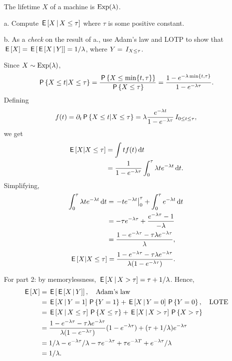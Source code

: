 \begin{exercise}
The lifetime $X$ of a machine is $\Exp{\lambda}$.

a. Compute $\E{X \given X\leq \tau}$ where $\tau$ is some positive constant.

b. As a \emph{check} on the result of a., use  Adam's law and LOTP to show that $\E{X} = \E{\E{X\given Y}} = 1/\lambda$, where $Y=\1{X\leq \tau}$.
\begin{solution}
Since $X\sim \Exp{\lambda}$,
\begin{equation*}
\P{X\leq t | X\leq \tau} = \frac{\P{X\leq \min\{t, \tau\}}}{\P{X\leq \tau}} = \frac{1-e^{-\lambda\min\{t, \tau\}}}{1-e^{-\lambda \tau}}.
\end{equation*}
 Defining
\begin{equation*}
  f(t) = \partial_{t} \P{X\leq t | X\leq \tau} = \lambda \frac{e^{-\lambda t}}{1-e^{-\lambda \tau}} \1{0\leq t \leq \tau},
\end{equation*}
we get
\begin{align}
  \label{eq:9925}
\E{X|X\leq \tau}
&= \int t f(t) \d t \\
&= \frac{1}{1-e^{-\lambda \tau}}\int_{0}^{\tau} \lambda t e^{-\lambda t} \d t.
\end{align}
Simplifying,
\begin{align}
\label{eq:926}
\int_0^{\tau} \lambda t e^{-\lambda t} \d t
&= \left.- t e^{-\lambda t}\right|_{0}^{\tau} + \int_0^{\tau} e^{-\lambda t} \d t \\
&= -\tau e^{-\lambda \tau} + \frac{e^{-\lambda \tau} -1}{-\lambda} \\
&= \frac{ 1- e^{-\lambda \tau}- \tau \lambda  e^{-\lambda \tau}}{\lambda},
\end{align}
\begin{align}
  \label{eq:925}
\E{X|X\leq \tau}
&= \frac{ 1- e^{-\lambda \tau}- \tau \lambda  e^{-\lambda \tau}}{\lambda(1-e^{-\lambda \tau})}.
\end{align}

For part 2: by memorylessness, $\E{X\given X>\tau} = \tau + 1/\lambda$. Hence,
\begin{align}
  \label{eq:94}
\E X
&= \E{\E{X\given Y}}, \quad \text{Adam's law} \\
&= \E{X\given Y=1}\P{Y=1} + \E{X\given Y=0}\P{Y=0}, \quad \text{LOTE}\\
&= \E{X\given X\leq \tau}\P{X\leq \tau} + \E{X\given X>\tau} \P{X>\tau} \\
&= \frac{ 1- e^{-\lambda \tau}- \tau \lambda  e^{-\lambda \tau}}{\lambda(1-e^{-\lambda \tau})} (1-e^{-\lambda \tau}) + (\tau+ 1/\lambda) e^{-\lambda \tau} \\
&= 1/\lambda - e^{-\lambda \tau}/\lambda - \tau e^{-\lambda \tau} + \tau e^{-\lambda T} + e^{-\lambda \tau}/\lambda \\
&=1/\lambda.
\end{align}


\end{solution}
\end{exercise}
